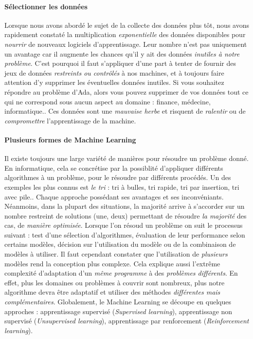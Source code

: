 \paragraph{Sélectionner les données} Lorsque nous avons abordé le sujet de la collecte des données plus tôt, nous avons rapidement constaté la 
multiplication \emph{exponentielle} des données disponibles pour \emph{nourrir} de nouveaux logiciels d'apprentissage. Leur nombre n'est pas
uniquement un avantage car il augmente les chances qu'il y ait des données \emph{inutiles à notre problème}. C'est pourquoi il faut s'appliquer
d'une part à tenter de fournir des jeux de données \emph{restreints ou contrôlés} à nos machines, et à toujours faire attention d'y supprimer les
éventuelles données inutiles. Si vous souhaitez répondre au problème d'Ada, alors vous pouvez supprimer de vos données tout ce qui ne correspond
sous aucun aspect au domaine : finance, médecine, informatique.. Ces données sont une \emph{mauvaise herbe} et risquent de \emph{ralentir} ou de
\emph{compromettre} l'apprentissage de la machine. 

\paragraph{Plusieurs formes de Machine Learning} Il existe toujours une large variété de manières pour résoudre un problème donné. En informatique, cela se concrétise par la possiblité
d'appliquer différents algorithmes à un problème, pour le résoudre par différents procédés. Un des exemples les plus connus est \emph{le tri} : tri à
bulles, tri rapide, tri par insertion, tri avec pile.. Chaque approche possédant ses avantages et ses inconvéniants. Néanmoins, dans la plupart des
situations, la majorité arrive à s'accorder sur un nombre restreint de solutions (une, deux) permettant de résoudre \emph{la majorité} des cas, de \emph{manière optimisée}.
Lorsque l'on résoud un problème on suit le processus suivant : test d'une sélection d'algorithmes, évaluation de leur performance selon certains
modèles, décision sur l'utilisation du modèle ou de la combinaison de modèles à utiliser. Il faut cependant constater que l'utilisation de \emph{plusieurs}
modèles rend la conception plus complexe. Cela explique aussi l'extrême complexité d'adaptation d'un \emph{même programme} à des \emph{problèmes différents}.
En effet, plus les domaines ou problèmes à couvrir sont nombreux, plus notre algorithme devra être adaptatif et utiliser des méthodes \emph{différentes mais complémentaires}. 
Globalement, le Machine Learning se découpe en quelques approches : apprentissage supervisé (\emph{Supervised learning}), apprentissage non supervisé
(\emph{Unsupervised learning}), apprentissage par renforcement (\emph{Reinforcement learning}).

